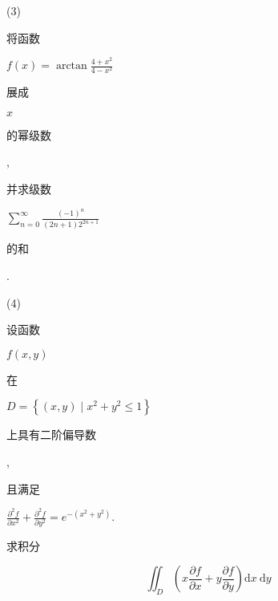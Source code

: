 \documentclass[10pt]{article}
\begin{document}
(3) \begin{CJK}{UTF8}{mj}将函数\end{CJK} $f(x)=\arctan \frac{4+x^{2}}{4-x^{2}}$ \begin{CJK}{UTF8}{mj}展成\end{CJK} $x$ \begin{CJK}{UTF8}{mj}的幂级数\end{CJK}, \begin{CJK}{UTF8}{mj}并求级数\end{CJK} $\sum_{n=0}^{\infty} \frac{(-1)^{n}}{(2 n+1) 2^{2 n+1}}$ \begin{CJK}{UTF8}{mj}的和\end{CJK}.

(4) \begin{CJK}{UTF8}{mj}设函数\end{CJK} $f(x, y)$ \begin{CJK}{UTF8}{mj}在\end{CJK} $D=\left\{(x, y) \mid x^{2}+y^{2} \leq 1\right\}$ \begin{CJK}{UTF8}{mj}上具有二阶偏导数\end{CJK}, \begin{CJK}{UTF8}{mj}且满足\end{CJK} $\frac{\partial^{2} f}{\partial x^{2}}+\frac{\partial^{2} f}{\partial y^{2}}=e^{-\left(x^{2}+y^{2}\right)}$. \begin{CJK}{UTF8}{mj}求积分\end{CJK}
$$
\iint_{D}\left(x \frac{\partial f}{\partial x}+y \frac{\partial f}{\partial y}\right) \mathrm{d} x \mathrm{~d} y
$$
\end{document}
